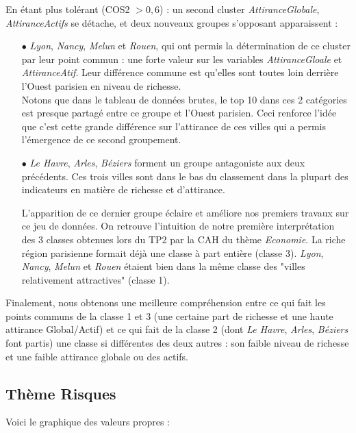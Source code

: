 \documentclass{article}
\begin{document}
En étant plus tolérant (COS2 $> 0,6$) : un second cluster  \emph{AttiranceGlobale}, \emph{AttiranceActifs} se détache, et deux nouveaux groupes s'opposant apparaissent :
\begin{itemize}
\item[$\bullet$] \emph{Lyon}, \emph{Nancy}, \emph{Melun} et \emph{Rouen}, qui ont permis la détermination de ce cluster par leur point commun : une forte valeur sur les  variables \emph{AttiranceGloale} et \emph{AttiranceAtif}. Leur différence commune est qu'elles sont toutes loin derrière l'Ouest parisien en niveau de richesse.\\ 
Notons que dans le tableau de données brutes, le top 10 dans ces 2 catégories est presque partagé entre ce groupe et l'Ouest parisien. Ceci renforce l'idée que c'est cette grande différence sur l'attirance de ces villes qui a permis l'émergence de ce second groupement.

\item[$\bullet$] \emph{Le Havre}, \emph{Arles}, \emph{Béziers} forment un groupe antagoniste aux deux précédents. Ces trois villes sont dans le bas du classement dans la plupart des indicateurs en matière de richesse et d'attirance.

L'apparition de ce dernier groupe éclaire et améliore nos premiers travaux sur ce jeu de données. On retrouve l'intuition de notre première interprétation des 3 classes obtenues lors du TP2 par la CAH du thème \emph{Economie}. La riche région parisienne formait déjà une classe à part entière (classe 3). \emph{Lyon}, \emph{Nancy}, \emph{Melun} et \emph{Rouen}
 étaient bien dans la même classe des "villes relativement attractives" (classe 1).
\end{itemize}

Finalement, nous obtenons une meilleure compréhension entre ce qui fait les points communs de la classe 1 et 3 (une certaine part de richesse et une haute attirance Global/Actif) et ce qui fait de la classe 2 (dont \emph{Le Havre}, \emph{Arles}, \emph{Béziers} font partis) une classe si différentes des deux autres : son faible niveau de richesse et une faible attirance globale ou des actifs.

\newpage

\subsection{Thème Risques}

Voici le graphique des valeurs propres :
\end{document}
